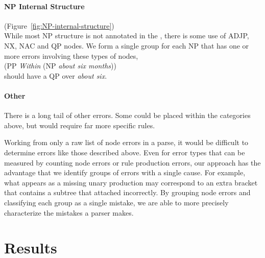 \begin{landscape}
\begin{figure}
\begin{minipage}[b]{4in}
\centering

\end{minipage}\hfill
\begin{minipage}[b]{4in}
\centering

\end{minipage}
\end{figure}
\end{landscape}

\begin{figure}
\centering

\end{figure}

\paragraph{NP Internal Structure} (Figure~\ref{fig:NP-internal-structure}) \\
While most NP structure is not annotated in the \ptb, there is some use of ADJP, NX, NAC and QP nodes.
We form a single group for each NP that has one or more errors involving these types of nodes, \myeg \\
(PP \emph{Within} (NP \emph{about six months})) \\
should have a QP over \emph{about six}.

\paragraph{Other}
There is a long tail of other errors.
Some could be placed within the categories above, but would require far more specific rules.

Working from only a raw list of node errors in a parse, it would be difficult to determine errors like those described above.
Even for error types that can be measured by counting node errors or rule production errors, our approach has the advantage that we identify groups of errors with a single cause.
For example, what appears as a missing unary production may correspond to an extra bracket that contains a subtree that attached incorrectly.
By grouping node errors and classifying each group as a single mistake, we are able to more precisely characterize the mistakes a parser makes.

\section{Results} \label{sec:errors-results}

